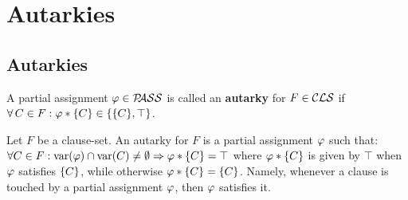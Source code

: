 \documentclass[12pt]{book}
\begin{document}
\chapter{Autarkies}
\label{cha:Autarkies}
\section{Autarkies}
\label{sec:Autarkies}

\begin{defi}\label{def:autarky1}
      A partial assignment $\varphi \in \mathcal{P\hspace{-0.32em}ASS}$ is called an \textbf{autarky} for $F \in \mathcal{CLS}$ if $\forall\, C \in F : \varphi * \{ C \} \in \{ \{ C \}, \top \}$.
\end{defi}

Let $F$ be a clause-set. An autarky for $F$ is a partial assignment $\varphi$ such that: $\forall C \in F : \operatorname{var}(\varphi) \cap \operatorname{var}(C) \neq \emptyset \Rightarrow \varphi * \{ C \} = \top$ where $\varphi * \{ C \}$ is given by $\top$ when $\varphi$ 
satisfies $\{ C \}$, while otherwise $\varphi * \{ C \} = \{ C \}$. 
Namely, whenever a clause is touched by a partial assignment $\varphi$, then $\varphi$ satisfies it.
\end{document}
